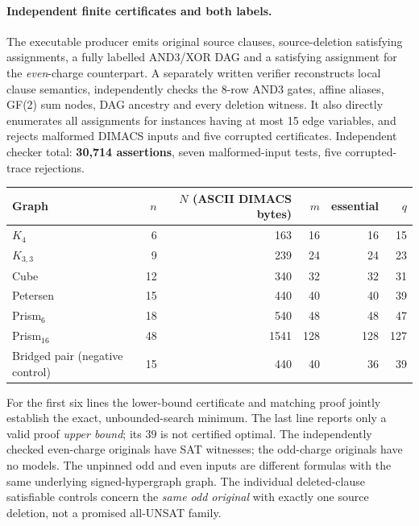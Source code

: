 \documentclass[11pt]{article}
\begin{document}
\paragraph{Independent finite certificates and both labels.}
The executable producer emits original source clauses, source-deletion satisfying assignments, a fully labelled AND3/XOR DAG and a satisfying assignment for the \emph{even}-charge counterpart. A separately written verifier reconstructs local clause semantics, independently checks the $8$-row AND3 gates, affine aliases, GF(2) sum nodes, DAG ancestry and every deletion witness. It also directly enumerates all assignments for instances having at most 15 edge variables, and rejects malformed DIMACS inputs and five corrupted certificates. Independent checker total: \textbf{30,714 assertions}, seven malformed-input tests, five corrupted-trace rejections.
\begin{center}
\begin{tabular}{lrrrrr}
\toprule
Graph & $n$ & $N$ (ASCII DIMACS bytes) & $m$ & essential & $q$\\
\midrule
$K_4$ & 6 & 163 & 16 & 16 & 15\\
$K_{3,3}$ & 9 & 239 & 24 & 24 & 23\\
Cube & 12 & 340 & 32 & 32 & 31\\
Petersen & 15 & 440 & 40 & 40 & 39\\
Prism$_6$ & 18 & 540 & 48 & 48 & 47\\
Prism$_{16}$ & 48 & 1541 & 128 & 128 & 127\\
Bridged pair (negative control) & 15 & 440 & 40 & 36 & 39\\
\bottomrule
\end{tabular}
\end{center}
For the first six lines the lower-bound certificate and matching proof jointly establish the exact, unbounded-search minimum. The last line reports only a valid proof \emph{upper bound}; its $39$ is not certified optimal. The independently checked even-charge originals have SAT witnesses; the odd-charge originals have no models. The unpinned odd and even inputs are different formulas with the same underlying signed-hypergraph graph. The individual deleted-clause satisfiable controls concern the \emph{same odd original} with exactly one source deletion, not a promised all-UNSAT family.
\end{document}
